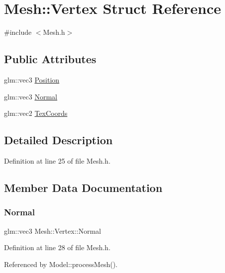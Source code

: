 \hypertarget{structMesh_1_1Vertex}{}\section{Mesh\+:\+:Vertex Struct Reference}
\label{structMesh_1_1Vertex}


{\ttfamily \#include $<$Mesh.\+h$>$}

\subsection*{Public Attributes}
\begin{DoxyCompactItemize}
\item 
glm\+::vec3 \mbox{\hyperlink{structMesh_1_1Vertex_a6c5e0102d84ee335346ef8fadf43ecd0}{Position}}
\item 
glm\+::vec3 \mbox{\hyperlink{structMesh_1_1Vertex_a9e1d54510bff2f84467dfb7b556708a5}{Normal}}
\item 
glm\+::vec2 \mbox{\hyperlink{structMesh_1_1Vertex_a7f4c7ecd20476006a2869452cb2e022b}{Tex\+Coords}}
\end{DoxyCompactItemize}


\subsection{Detailed Description}


Definition at line 25 of file Mesh.\+h.



\subsection{Member Data Documentation}
\mbox{\label{structMesh_1_1Vertex_a9e1d54510bff2f84467dfb7b556708a5}} 
\subsubsection{\texorpdfstring{Normal}{Normal}}
{\footnotesize\ttfamily glm\+::vec3 Mesh\+::\+Vertex\+::\+Normal}



Definition at line 28 of file Mesh.\+h.



Referenced by Model\+::process\+Mesh().

